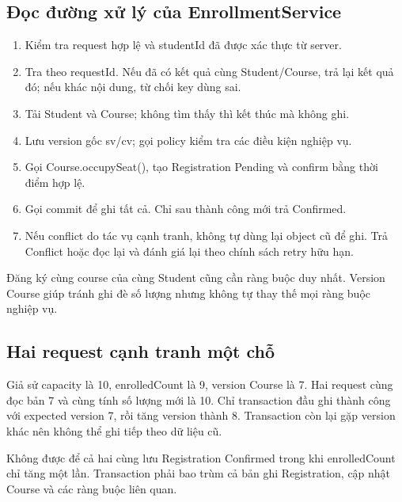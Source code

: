 \subsection{Đọc đường xử lý của EnrollmentService}
\begin{enumerate}
  \item Kiểm tra request hợp lệ và studentId đã được xác thực từ server.
  \item Tra theo requestId. Nếu đã có kết quả cùng Student/Course, trả lại kết quả đó; nếu khác nội dung, từ chối key dùng sai.
  \item Tải Student và Course; không tìm thấy thì kết thúc mà không ghi.
  \item Lưu version gốc sv/cv; gọi policy kiểm tra các điều kiện nghiệp vụ.
  \item Gọi Course.occupySeat(), tạo Registration Pending và confirm bằng thời điểm hợp lệ.
  \item Gọi commit để ghi tất cả. Chỉ sau thành công mới trả Confirmed.
  \item Nếu conflict do tác vụ cạnh tranh, không tự dùng lại object cũ để ghi. Trả Conflict hoặc đọc lại và đánh giá lại theo chính sách retry hữu hạn.
\end{enumerate}

Đăng ký cùng course của cùng Student cũng cần ràng buộc duy nhất. Version Course giúp tránh ghi đè số lượng nhưng không tự thay thế mọi ràng buộc nghiệp vụ.

\subsection{Hai request cạnh tranh một chỗ}
Giả sử capacity là 10, enrolledCount là 9, version Course là 7. Hai request cùng đọc bản 7 và cùng tính số lượng mới là 10. Chỉ transaction đầu ghi thành công với expected version 7, rồi tăng version thành 8. Transaction còn lại gặp version khác nên không thể ghi tiếp theo dữ liệu cũ.

Không được để cả hai cùng lưu Registration Confirmed trong khi enrolledCount chỉ tăng một lần. Transaction phải bao trùm cả bản ghi Registration, cập nhật Course và các ràng buộc liên quan.

